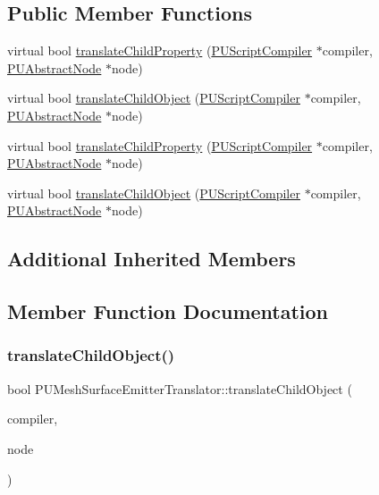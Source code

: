 \subsection*{Public Member Functions}
\begin{DoxyCompactItemize}
\item 
virtual bool \hyperlink{classPUMeshSurfaceEmitterTranslator_abda70a21c5d7d3803e31b1ad86fa895d}{translate\+Child\+Property} (\hyperlink{classPUScriptCompiler}{P\+U\+Script\+Compiler} $\ast$compiler, \hyperlink{classPUAbstractNode}{P\+U\+Abstract\+Node} $\ast$node)
\item 
virtual bool \hyperlink{classPUMeshSurfaceEmitterTranslator_a96d2d72c1915b0ef11c7d34d84ca646a}{translate\+Child\+Object} (\hyperlink{classPUScriptCompiler}{P\+U\+Script\+Compiler} $\ast$compiler, \hyperlink{classPUAbstractNode}{P\+U\+Abstract\+Node} $\ast$node)
\item 
virtual bool \hyperlink{classPUMeshSurfaceEmitterTranslator_a0f3b7e1bdf56f0eb1920cacffe8f59d9}{translate\+Child\+Property} (\hyperlink{classPUScriptCompiler}{P\+U\+Script\+Compiler} $\ast$compiler, \hyperlink{classPUAbstractNode}{P\+U\+Abstract\+Node} $\ast$node)
\item 
virtual bool \hyperlink{classPUMeshSurfaceEmitterTranslator_a7d8b36e8528847c02c20a899e7cfd651}{translate\+Child\+Object} (\hyperlink{classPUScriptCompiler}{P\+U\+Script\+Compiler} $\ast$compiler, \hyperlink{classPUAbstractNode}{P\+U\+Abstract\+Node} $\ast$node)
\end{DoxyCompactItemize}
\subsection*{Additional Inherited Members}


\subsection{Member Function Documentation}
\mbox{\label{classPUMeshSurfaceEmitterTranslator_a96d2d72c1915b0ef11c7d34d84ca646a}} 
\subsubsection{\texorpdfstring{translate\+Child\+Object()}{translateChildObject()}\hspace{0.1cm}{\footnotesize\ttfamily [1/2]}}
{\footnotesize\ttfamily bool P\+U\+Mesh\+Surface\+Emitter\+Translator\+::translate\+Child\+Object (\begin{DoxyParamCaption}\item[{\hyperlink{classPUScriptCompiler}{P\+U\+Script\+Compiler} $\ast$}]{compiler,  }\item[{\hyperlink{classPUAbstractNode}{P\+U\+Abstract\+Node} $\ast$}]{node }\end{DoxyParamCaption})\hspace{0.3cm}{\ttfamily [virtual]}}


